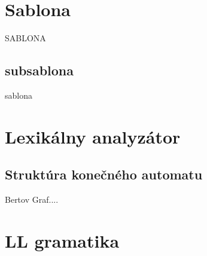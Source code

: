 \documentclass[12pt,a4paper,titlepage,final]{article}
\begin{document}
\pagestyle{plain}
\setcounter{page}{1}
\tableofcontents

\newpage
\pagestyle{plain}
\setcounter{page}{1}


\section{Sablona} \label{uvod}
\begin{center}
\end{center}
SABLONA


\subsection{subsablona}
sablona
\newpage

\section{Lexikálny analyzátor} \label{Lexikalny analyzator}

\subsection{Struktúra konečného automatu}
Bertov Graf....
\newpage

\section{LL gramatika} \label{LL gramatika}
\end{document}
